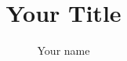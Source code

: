 \documentclass[a4paper,12pt,fleqn]{report}
\begin{document}
\title{Your Title}
\author{Your name}
\maketitle
     


%
%
\tableofcontents

%
%
\listoffigures

%
%
\listoftables


%
%
%

%
  
\end{document}
